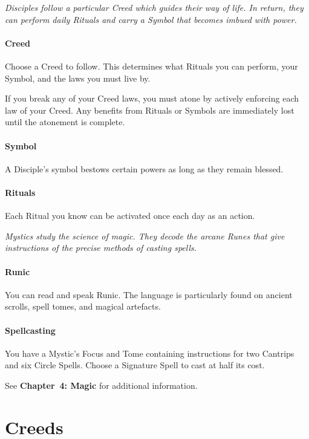 \documentclass[itdr]{subfiles}
\begin{document}
{\em Disciples follow a particular Creed which guides their way of life. In return, they can perform daily Rituals and carry a Symbol that becomes imbued with power.}

\paragraph{Creed}
Choose a Creed to follow. This determines what Rituals you can perform, your Symbol, and the laws you must live by.

If you break any of your Creed laws, you must atone by actively enforcing each law of your Creed. Any benefits from Rituals or Symbols are immediately lost until the atonement is complete.

\paragraph{Symbol}
A Disciple's symbol bestows certain powers as long as they remain blessed.

\paragraph{Rituals}
Each Ritual you know can be activated once each day as an action.

\vfill

{\em Mystics study the science of magic. They decode the arcane Runes that give instructions of the precise methods of casting spells.}

\paragraph{Runic}
You can read and speak Runic. The language is particularly found on ancient scrolls, spell tomes, and magical artefacts.

\paragraph{Spellcasting}
You have a Mystic's Focus and Tome containing instructions for two Cantrips and six  Circle Spells. Choose a Signature Spell to cast at half its cost.

See \textbf{Chapter~4: Magic} for additional information.

\vfill
\break

\section{Creeds}
\end{document}
